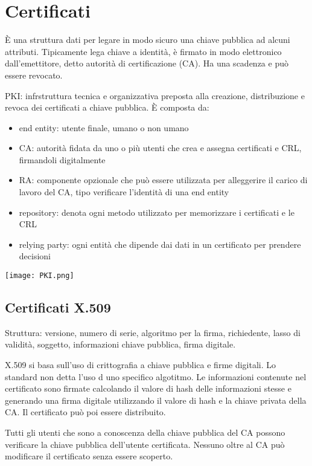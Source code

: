 \documentclass[11pt]{article}
\begin{document}
\section{Certificati}
È una struttura dati per legare in modo sicuro una chiave pubblica ad alcuni attributi. Tipicamente lega chiave a identità,
è firmato in modo elettronico dall'emettitore, detto autorità di certificazione (CA). Ha una scadenza e può essere revocato.

PKI: infrstruttura tecnica e organizzativa preposta alla creazione, distribuzione e revoca dei certificati a chiave pubblica.
È composta da:
\begin{itemize}
    \item end entity: utente finale, umano o non umano 
    \item CA: autorità fidata da uno o più utenti che crea e assegna certificati e CRL, firmandoli digitalmente
    \item RA: componente opzionale che può essere utilizzata per alleggerire il carico di lavoro del CA, tipo verificare 
    l'identità di una end entity 
    \item repository: denota ogni metodo utilizzato per memorizzare i certificati e le CRL 
    \item relying party: ogni entità che dipende dai dati in un certificato per prendere decisioni 
\end{itemize}
\begin{center}
    \texttt{[image: PKI.png]}
\end{center}
\subsection{Certificati X.509}
Struttura: versione, numero di serie, algoritmo per la firma, richiedente, lasso di validità, soggetto, informazioni chiave
pubblica, firma digitale.

X.509 si basa sull'uso di crittografia a chiave pubblica e firme digitali. Lo standard non detta l'uso d uno specifico 
algotitmo. Le informazioni contenute nel certificato sono firmate calcolando il valore di hash delle informazioni stesse 
e generando una firma digitale utilizzando il valore di hash e la chiave privata della CA. Il certificato può poi essere  
distribuito.

Tutti gli utenti che sono a conoscenza della chiave pubblica del CA possono verificare la chiave pubblica dell'utente certificata.
Nessuno oltre al CA può modificare il certificato senza essere scoperto.
\end{document}
